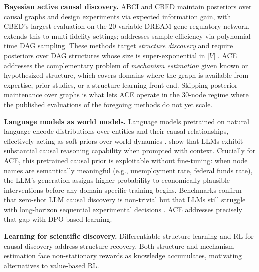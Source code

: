 \documentclass{article}
\theoremstyle{plain}
\theoremstyle{definition}
\theoremstyle{remark}
\begin{document}
\textbf{Bayesian active causal discovery.} ABCI \citep{toth2022active} and CBED \citep{tigas2022interventions} maintain posteriors over causal graphs and design experiments via expected information gain, with CBED's largest evaluation on the 20-variable DREAM gene regulatory network. \citet{zhang2023bayesian} extends this to multi-fidelity settings; \citet{zhou2024sample} addresses sample efficiency via polynomial-time DAG sampling. These methods target \emph{structure discovery} and require posteriors over DAG structures whose size is super-exponential in $|V|$ \citep{chickering1996learning}. ACE addresses the complementary problem of \emph{mechanism estimation} given known or hypothesized structure, which covers domains where the graph is available from expertise, prior studies, or a structure-learning front end. Skipping posterior maintenance over graphs is what lets ACE operate in the 30-node regime where the published evaluations of the foregoing methods do not yet scale.

\textbf{Language models as world models.} Language models pretrained on natural language encode distributions over entities and their causal relationships, effectively acting as soft priors over world dynamics \citep{hao2023reasoning,xie2022explanation}. \citet{kiciman2023causal} show that LLMs exhibit substantial causal reasoning capability when prompted with context. Crucially for ACE, this pretrained causal prior is exploitable without fine-tuning: when node names are semantically meaningful (e.g., unemployment rate, federal funds rate), the LLM's generation assigns higher probability to economically plausible interventions before any domain-specific training begins. Benchmarks confirm that zero-shot LLM causal discovery is non-trivial \citep{llm_science_survey2025} but that LLMs still struggle with long-horizon sequential experimental decisions \citep{boxinggym2025,autobench2025}. ACE addresses precisely that gap with DPO-based learning.

\textbf{Learning for scientific discovery.} Differentiable structure learning \citep{lorch2021dibs} and RL for causal discovery \citep{core2024,gacbo2024} address structure recovery. Both structure and mechanism estimation face non-stationary rewards as knowledge accumulates, motivating alternatives to value-based RL.
\end{document}
